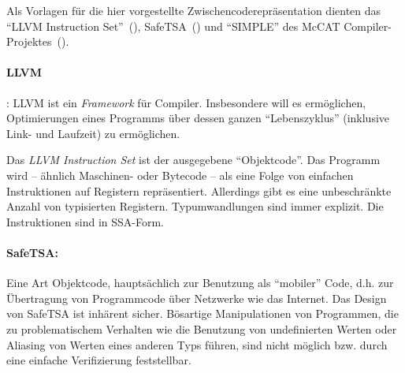 \documentclass[twoside,a4paper,fleqn,12pt]{book}
\begin{document}
Als Vorlagen für die hier vorgestellte Zwischencoderepräsentation dienten das ``LLVM Instruction Set''~(\cite{LLVM:CGO04}),
SafeTSA~(\cite{SafeTSA}) und ``SIMPLE'' des McCAT Compiler-Projektes~(\cite{SIMPLE}).


\paragraph{LLVM}: LLVM ist ein \emph{Framework} für Compiler. Insbesondere will es ermöglichen, Optimierungen
eines Programms über dessen ganzen "`Lebenszyklus"' (inklusive Link- und Laufzeit) zu ermöglichen.

Das \emph{LLVM Instruction Set} ist der ausgegebene "`Objektcode"'. Das Programm wird -- ähnlich Maschinen-
oder Bytecode -- als eine Folge von einfachen Instruktionen auf Registern repräsentiert. 
Allerdings gibt es eine unbeschränkte Anzahl von typisierten Registern. Typumwandlungen sind immer explizit.
Die Instruktionen sind in SSA-Form.



\paragraph{SafeTSA:} Eine Art Objektcode, hauptsächlich zur Benutzung
als "`mobiler"' Code, d.h. zur Übertragung von Programmcode über Netzwerke wie das Internet.
Das Design von SafeTSA ist inhärent sicher. Bösartige Manipulationen von Programmen, die zu
problematischem Verhalten wie die Benutzung von undefinierten Werten oder Aliasing von Werten
eines anderen Typs führen, sind nicht möglich bzw. durch eine einfache Verifizierung feststellbar.
\end{document}
